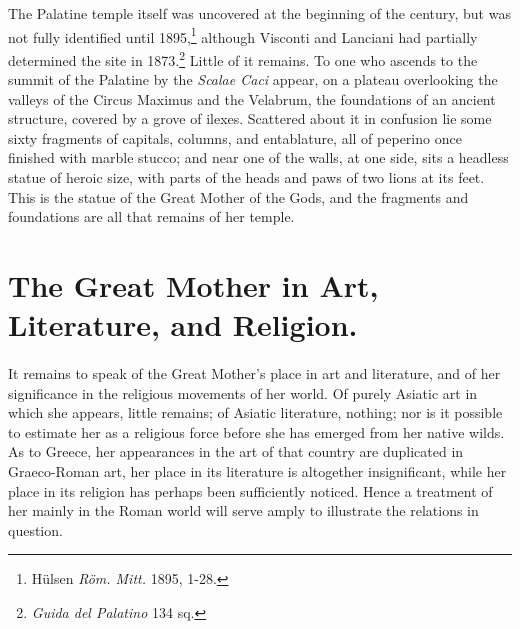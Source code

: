 \documentclass[a4paper, 11pt, oneside, polutonikogreek, french]{article}
\begin{document}
The Palatine temple itself was uncovered at the beginning of the century, but was not fully identified until 1895,\footnote{Hülsen \emph{Röm. Mitt.} 1895, 1-28.} although Visconti and Lanciani had partially determined the site in 1873.\footnote{\emph{Guida del Palatino} 134 sq.} Little of it remains. To one who ascends to the summit of the Palatine by the \emph{Scalae Caci} appear, on a plateau overlooking the valleys of the Circus Maximus and the Velabrum, the foundations of an ancient structure, covered by a grove of ilexes. Scattered about it in confusion lie some sixty fragments of capitals, columns, and entablature, all of peperino once finished with marble stucco; and near one of the walls, at one side, sits a headless statue of heroic size, with parts of the heads and paws of two lions at its feet. This is the statue of the Great Mother of the Gods, and the fragments and foundations are all that remains of her temple.
\clearpage
\section{The Great Mother in Art, Literature, and Religion.}
\paragraph{}
It remains to speak of the Great Mother's place in art and literature, and of her significance in the religious movements of her world. Of purely Asiatic art in which she appears, little remains; of Asiatic literature, nothing; nor is it possible to estimate her as a religious force before she has emerged from her native wilds. As to Greece, her appearances in the art of that country are duplicated in Graeco-Roman art, her place in its literature is altogether insignificant, while her place in its religion has perhaps been sufficiently noticed. Hence a treatment of her mainly in the Roman world will serve amply to illustrate the relations in question.
\end{document}
